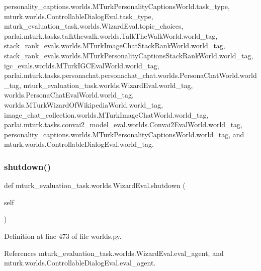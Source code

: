 personality\+\_\+captions.\+worlds.\+M\+Turk\+Personality\+Captions\+World.\+task\+\_\+type, mturk.\+worlds.\+Controllable\+Dialog\+Eval.\+task\+\_\+type, mturk\+\_\+evaluation\+\_\+task.\+worlds.\+Wizard\+Eval.\+topic\+\_\+choices, parlai.\+mturk.\+tasks.\+talkthewalk.\+worlds.\+Talk\+The\+Walk\+World.\+world\+\_\+tag, stack\+\_\+rank\+\_\+evals.\+worlds.\+M\+Turk\+Image\+Chat\+Stack\+Rank\+World.\+world\+\_\+tag, stack\+\_\+rank\+\_\+evals.\+worlds.\+M\+Turk\+Personality\+Captions\+Stack\+Rank\+World.\+world\+\_\+tag, igc\+\_\+evals.\+worlds.\+M\+Turk\+I\+G\+C\+Eval\+World.\+world\+\_\+tag, parlai.\+mturk.\+tasks.\+personachat.\+personachat\+\_\+chat.\+worlds.\+Persona\+Chat\+World.\+world\+\_\+tag, mturk\+\_\+evaluation\+\_\+task.\+worlds.\+Wizard\+Eval.\+world\+\_\+tag, worlds.\+Persona\+Chat\+Eval\+World.\+world\+\_\+tag, worlds.\+M\+Turk\+Wizard\+Of\+Wikipedia\+World.\+world\+\_\+tag, image\+\_\+chat\+\_\+collection.\+worlds.\+M\+Turk\+Image\+Chat\+World.\+world\+\_\+tag, parlai.\+mturk.\+tasks.\+convai2\+\_\+model\+\_\+eval.\+worlds.\+Convai2\+Eval\+World.\+world\+\_\+tag, personality\+\_\+captions.\+worlds.\+M\+Turk\+Personality\+Captions\+World.\+world\+\_\+tag, and mturk.\+worlds.\+Controllable\+Dialog\+Eval.\+world\+\_\+tag.

\mbox{\label{classmturk__evaluation__task_1_1worlds_1_1WizardEval_a1a5817fdfd4716e770ad6a5c8a2c33dc}} 
\subsubsection{\texorpdfstring{shutdown()}{shutdown()}}
{\footnotesize\ttfamily def mturk\+\_\+evaluation\+\_\+task.\+worlds.\+Wizard\+Eval.\+shutdown (\begin{DoxyParamCaption}\item[{}]{self }\end{DoxyParamCaption})}



Definition at line 473 of file worlds.\+py.



References mturk\+\_\+evaluation\+\_\+task.\+worlds.\+Wizard\+Eval.\+eval\+\_\+agent, and mturk.\+worlds.\+Controllable\+Dialog\+Eval.\+eval\+\_\+agent.



